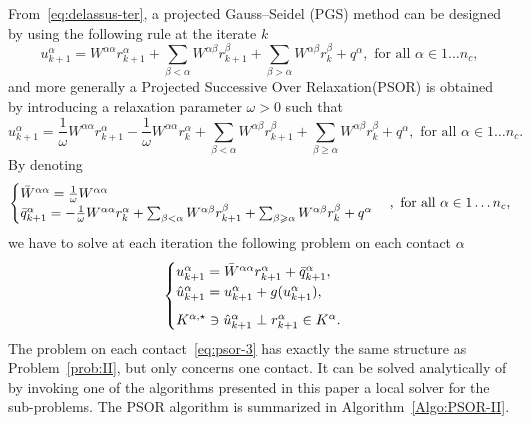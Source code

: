 From~\eqref{eq:delassus-ter}, a projected Gauss--Seidel (PGS) method can be designed by using the following rule at the iterate $k$
\begin{equation}
  \label{eq:pgs-1}
  u^{\alpha}_{k+1} = W^{\alpha\alpha} r^{\alpha}_{k+1} + \sum_{\beta < \alpha}W^{\alpha\beta} r^{\beta}_{k+1} + \sum_{\beta > \alpha}W^{\alpha\beta} r^{\beta}_{k} +  q^\alpha, \text{ for all } \alpha \in 1\ldots n_c,
\end{equation}
and more generally a Projected Successive Over Relaxation(PSOR) is obtained by introducing a relaxation parameter $\omega>0$ such that
\begin{equation}
  \label{eq:psor-1}
  u^{\alpha}_{k+1} = \frac 1 \omega W^{\alpha\alpha} r^{\alpha}_{k+1} 
  - \frac 1 \omega W^{\alpha\alpha} r^{\alpha}_{k} +
  \sum_{\beta < \alpha}W^{\alpha\beta} r^{\beta}_{k+1} + \sum_{\beta \geq \alpha}W^{\alpha\beta} r^{\beta}_{k} +  q^\alpha, \text{ for all } \alpha \in 1\ldots n_c.
\end{equation}
By denoting 
\begin{equation}
  \label{eq:psor-2}
  \begin{cases}
    \Bar W^{\alpha\alpha} = \frac 1 \omega W^{\alpha\alpha} \\
    \bar q^{\alpha}_{k+1} = - \frac 1 \omega W^{\alpha\alpha} r^{\alpha}_{k}
    + \sum_{\beta < \alpha}W^{\alpha\beta} r^{\beta}_{k+1} + \sum_{\beta
      \geq \alpha}W^{\alpha\beta} r^{\beta}_{k} + q^\alpha
  \end{cases}
, \text{ for all } \alpha \in 1\ldots n_c,
\end{equation}
we have to solve at each iteration the following problem on each contact $\alpha$
\begin{equation}\label{eq:psor-3}
  \begin{cases}
    u^{\alpha}_{k+1} =  \Bar W^{\alpha\alpha}  r^{\alpha}_{k+1} + \bar q^{\alpha}_{k+1}, \\
    \hat u^{\alpha}_{k+1} =u^{\alpha}_{k+1} + g(u^{\alpha}_{k+1}), \\[2mm]
    K^{\alpha,\star} \ni {\hat u^{\alpha}_{k+1}} \perp r^{\alpha}_{k+1} \in K^\alpha.
  \end{cases}
\end{equation}
The problem on each contact~\eqref{eq:psor-3} has exactly the same structure as Problem~\ref{prob:II}, but only concerns one contact. It can be solved analytically of by invoking one of the algorithms presented in this paper a local solver for the sub-problems. The PSOR algorithm is summarized in Algorithm~\ref{Algo:PSOR-II}.

